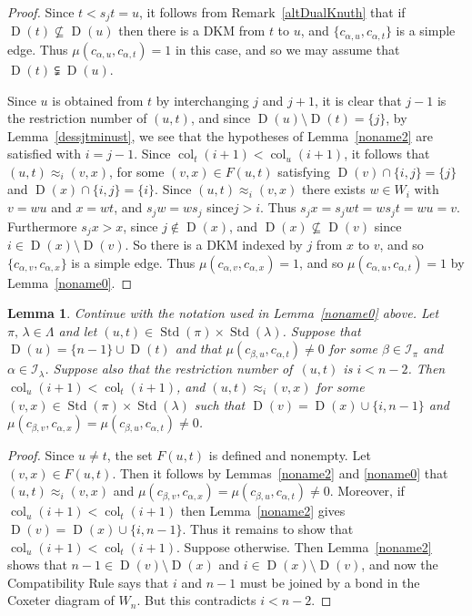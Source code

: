 \documentclass[10pt]{amsart}
\newtheorem{lemm}[theo]{Lemma}
\theoremstyle{definition}
\DeclareMathOperator{\col}{col}
\DeclareMathOperator{\STD}{Std}
\DeclareMathOperator{\D}{D}
\begin{document}
\begin{proof}
Since $t<s_jt=u$, it follows from Remark~\ref{altDualKnuth} that if $\D(t)\nsubseteq\D(u)$
then there is a DKM
from $t$ to $u$, and $\{c_{\alpha,u},c_{\alpha,t}\}$
is a simple edge. Thus $\mu(c_{\alpha,u},c_{\alpha,t}) = 1$ in this case, and so we may
assume that $\D(t)\subsetneqq\D(u)$.

Since $u$ is obtained from $t$ by interchanging $j$ and $j+1$, it is clear
that $j-1$ is the restriction number of $(u,t)$, and since $\D(u)\setminus\D(t)=\{j\}$,
by Lemma~\ref{dessjtminust}, we see that the hypotheses of Lemma~\ref{noname2} are
satisfied with $i=j-1$. Since $\col_t(i+1)<\col_u(i+1)$, it
follows that $(u,t)\approx_i(v,x)$, for some $(v,x)\in F(u,t)$ satisfying
$\D(v)\cap\{i,j\}=\{j\}$ and $\D(x)\cap\{i,j\}=\{i\}$. Since
$(u,t)\approx_i(v,x)$ there exists $w\in W_i$ with $v=wu$ and $x=wt$, and
$s_jw=ws_j$ since$j>i$. Thus $s_jx=s_jwt=ws_jt=wu=v$. Furthermore $s_jx>x$, since
$j\notin\D(x)$, and $\D(x)\nsubseteq\D(v)$ since $i\in\D(x)\setminus\D(v)$.
So there is a DKM
indexed by $j$ from $x$ to $v$, and so
$\{c_{\alpha,v},c_{\alpha,x}\}$ is a simple edge. Thus
$\mu(c_{\alpha,v},c_{\alpha,x})=1$, and so $\mu(c_{\alpha,u},c_{\alpha,t})=1$ by
Lemma~\ref{noname0}.
\end{proof}

\begin{lemm}\label{noname1muequallambda}
Continue with the notation used in Lemma~\ref{noname0} above. Let
$\pi,\,\lambda\in\Lambda$ and let $(u,t)\in\STD(\pi)\times\STD(\lambda)$.
Suppose that $\D(u) = \{n-1\} \cup \D(t)$ and that $\mu(c_{\beta,u},c_{\alpha,t}) \neq 0$
for some $\beta\in\mathcal{I}_{\pi}$ and $\alpha\in\mathcal{I}_{\lambda}$.
Suppose also that the restriction number of~$(u,t)$
is $i< n-2$. Then $\col_u(i+1)<\col_t(i+1)$, and $(u,t)\approx_i (v,x)$ for some
$(v,x)\in\STD(\pi)\times\STD(\lambda)$ such that
$\D(v)=\D(x)\cup\{i,n-1\}$ and $\mu(c_{\beta,v},c_{\alpha,x})=\mu(c_{\beta,u},c_{\alpha,t}) \neq 0$.
\end{lemm}

\begin{proof}
Since $u\ne t$, the set $F(u,t)$ is defined and nonempty.
Let $(v,x)\in F(u,t)$. Then it follows by Lemmas~\ref{noname2} and
\ref{noname0} that $(u,t)\approx_i (v,x)$
and $\mu(c_{\beta,v},c_{\alpha,x})=\mu(c_{\beta,u},c_{\alpha,t}) \neq 0$.
Moreover, if $\col_u(i+1)<\col_t(i+1)$ then
Lemma~\ref{noname2} gives $\D(v)=\D(x)\cup\{i,n-1\}$. Thus it
remains to show that $\col_u(i+1)<\col_t(i+1)$. Suppose otherwise.
Then Lemma~\ref{noname2} shows that $n-1\in\D(v)\setminus\D(x)$
and $i\in\D(x)\setminus\D(v)$, and now the
Compatibility Rule
says that
$i$ and $n-1$ must be joined by a bond in the Coxeter diagram of $W_n$.
But this contradicts $i<n-2$.
\end{proof}
\end{document}
